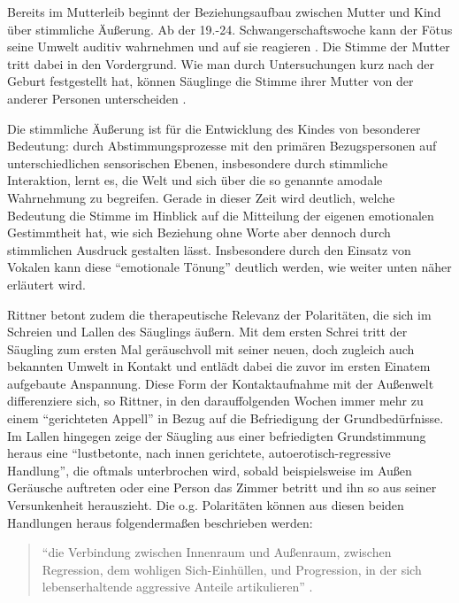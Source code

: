 Bereits im Mutterleib beginnt der Beziehungsaufbau zwischen Mutter und Kind über stimmliche Äußerung. Ab der 19.-24. Schwangerschaftswoche kann der Fötus seine Umwelt auditiv wahrnehmen und auf sie reagieren \autocite[vgl.][110]{deckervoigt2008}. Die Stimme der Mutter tritt dabei in den Vordergrund. Wie man durch Untersuchungen kurz nach der Geburt festgestellt hat, können Säuglinge die Stimme ihrer Mutter von der anderer Personen unterscheiden \autocite [vgl.][22f]{noecker-ribeaupierre2004}. 

Die stimmliche Äußerung ist für die Entwicklung des Kindes von besonderer Bedeutung: durch Abstimmungsprozesse mit den primären Bezugspersonen auf unterschiedlichen sensorischen Ebenen, insbesondere durch stimmliche Interaktion, lernt es, die Welt und sich über die so genannte amodale Wahrnehmung zu begreifen. Gerade in dieser Zeit wird deutlich, welche Bedeutung die Stimme im Hinblick auf die Mitteilung der eigenen emotionalen Gestimmtheit hat, wie sich Beziehung ohne Worte aber dennoch durch stimmlichen Ausdruck gestalten lässt. Insbesondere durch den Einsatz von Vokalen kann diese "`emotionale Tönung"' \autocite[205]{rittner2008} deutlich werden, wie weiter unten näher erläutert wird.

Rittner \autocite [vgl.][106f.]{rittner1990} betont zudem die therapeutische Relevanz der Polaritäten, die sich im Schreien und Lallen des Säuglings äußern. Mit dem ersten Schrei tritt der Säugling zum ersten Mal geräuschvoll mit seiner neuen, doch zugleich auch bekannten Umwelt in Kontakt und entlädt dabei die zuvor im ersten Einatem aufgebaute Anspannung. Diese Form der Kontaktaufnahme mit der Außenwelt differenziere sich, so Rittner, in den darauffolgenden Wochen immer mehr zu einem "`gerichteten Appell"' in Bezug auf die Befriedigung der Grundbedürfnisse. Im Lallen hingegen zeige der Säugling aus einer befriedigten Grundstimmung heraus eine "`lustbetonte, nach innen gerichtete, autoerotisch-regressive Handlung"', die oftmals unterbrochen wird, sobald beispielsweise im Außen Geräusche auftreten oder eine Person das Zimmer betritt und ihn so aus seiner Versunkenheit herauszieht. 
Die o.g. Polaritäten können aus diesen beiden Handlungen heraus folgendermaßen beschrieben werden: 

\begin{quote}
\onehalfspacing
"`die Verbindung zwischen Innenraum und Außenraum, zwischen Regression, dem wohligen Sich-Einhüllen, und Progression, in der sich lebenserhaltende aggressive Anteile artikulieren"' \autocite[106f.]{rittner1990}. 
\end{quote}

